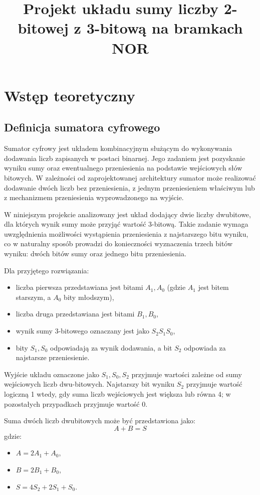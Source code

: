 \documentclass[11pt]{article}
\title{Projekt układu sumy liczby 2-bitowej z 3-bitową na bramkach NOR}
\author{}
\date{}
\begin{document}
\maketitle

\section{Wstęp teoretyczny}

\subsection{Definicja sumatora cyfrowego}

Sumator cyfrowy jest układem kombinacyjnym służącym do wykonywania dodawania liczb zapisanych w postaci binarnej. Jego zadaniem jest pozyskanie wyniku sumy oraz ewentualnego przeniesienia na podstawie wejściowych słów bitowych. W zależności od zaprojektowanej architektury sumator może realizować dodawanie dwóch liczb bez przeniesienia, z jednym przeniesieniem właściwym lub z mechanizmem przeniesienia wyprowadzonego na wyjście.

W niniejszym projekcie analizowany jest układ dodający dwie liczby dwubitowe, dla których wynik sumy może przyjąć wartość 3-bitową. Takie zadanie wymaga uwzględnienia możliwości wystąpienia przeniesienia z najstarszego bitu wyniku, co w naturalny sposób prowadzi do konieczności wyznaczenia trzech bitów wyniku: dwóch bitów sumy oraz jednego bitu przeniesienia.

Dla przyjętego rozwiązania:
\begin{itemize}
    \item liczba pierwsza przedstawiana jest bitami \(A_1, A_0\) (gdzie \(A_1\) jest bitem starszym, a \(A_0\) bity młodszym),
    \item liczba druga przedstawiana jest bitami \(B_1, B_0\),
    \item wynik sumy 3-bitowego oznaczany jest jako \(S_2 S_1 S_0\),
    \item bity \(S_1, S_0\) odpowiadają za wynik dodawania, a bit \(S_2\) odpowiada za najstarsze przeniesienie.
\end{itemize}

Wyjście układu oznaczone jako \(S_1, S_0, S_2\) przyjmuje wartości zależne od sumy wejściowych liczb dwu-bitowych. Najstarszy bit wyniku \(S_2\) przyjmuje wartość logiczną 1 wtedy, gdy suma liczb wejściowych jest większa lub równa 4; w pozostałych przypadkach przyjmuje wartość 0.

Suma dwóch liczb dwubitowych może być przedstawiona jako:
\begin{equation}
A + B = S
\end{equation}
gdzie:
\begin{itemize}
    \item \(A = 2A_1 + A_0\),
    \item \(B = 2B_1 + B_0\),
    \item \(S = 4S_2 + 2S_1 + S_0\).
\end{itemize}
\end{document}
